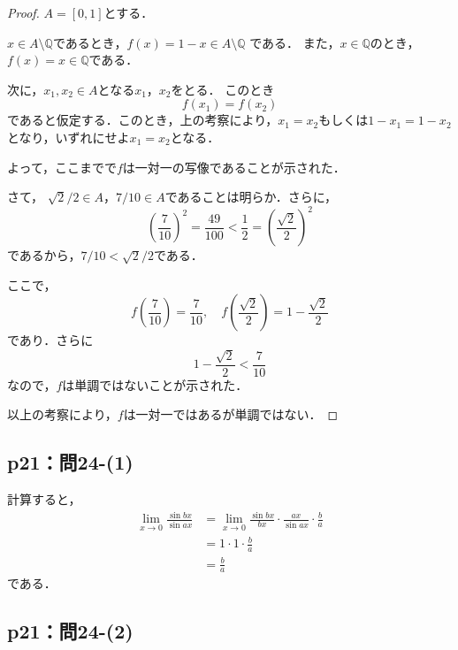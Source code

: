 \documentclass[uplatex,dvipdfmx,a4paper,10pt,fleqn]{jsarticle}
\begin{document}
\begin{tleftbar}
    \begin{proof}
    $ A = [0,1]$とする．

    $x \in A \setminus \mathbb{Q}$であるとき，$f(x)=1-x \in A \setminus \mathbb{Q}$ である．
    また，$x \in \mathbb{Q}$のとき，$f(x)=x \in \mathbb{Q}$である．

    次に，$ x_1 , x_2 \in A$となる$x_1$，$x_2$をとる．
    このとき
    \[
        f(x_1)=f(x_2)
    \]
    であると仮定する．このとき，上の考察により，$x_1 = x_2$もしくは$1-x_1 = 1-x_2$となり，いずれにせよ$x_1 =x_2$となる．

    よって，ここまでで$f$は一対一の写像であることが示された．
   
   さて， $ \sqrt{2}/2 \in A$，$7/10 \in A$であることは明らか．さらに，
    \[
        \left ( \frac{7}{10} \right)^2 = \frac{49}{100} <\frac{1}{2}=\left ( \frac{\sqrt{2}}{2} \right)^2 
    \]
    であるから，$7/10< \sqrt{2}/2$である．

    ここで，
    \[
    f\left ( \frac{7}{10} \right)=\frac{7}{10},\quad f\left(\frac{\sqrt{2}}{2} \right)= 1-\frac{\sqrt{2}}{2}
    \]
    であり．さらに
    \[
        1-\frac{\sqrt{2}}{2} <\frac{7}{10}
    \]
    なので，$f$は単調ではないことが示された．

    以上の考察により，$f$は一対一ではあるが単調ではない．
\end{proof}
\end{tleftbar}

\subsection*{p21：問24-(1)}

\begin{tleftbar}
    計算すると，
    \begin{align*} 
        \lim_{x \to 0} \frac{\sin bx}{\sin ax} & = \lim_{x \to 0} \frac{\sin bx}{b x} \cdot \frac{ax}{ \sin ax} \cdot \frac{b}{a} \\
        & = 1 \cdot 1 \cdot \frac{b}{a} \\
        & = \frac{b}{a}
    \end{align*} 
    である．
\end{tleftbar}

\subsection*{p21：問24-(2)}
\end{document}
